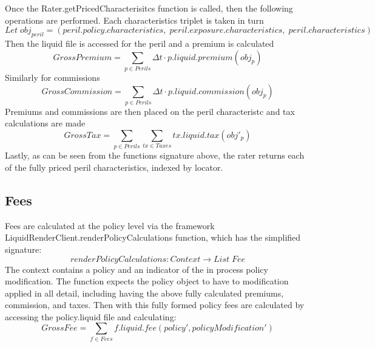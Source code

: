 Once the Rater.getPricedCharacterisitcs function is called, then the following operations are performed. Each
characteristics triplet is taken in turn
\begin{equation*}
Let \; obj_{peril} = (peril.policy.characteristics, \; peril.exposure.characteristics, \; peril.characteristics)
\end{equation*}
Then the liquid file is accessed for the peril and a premium is calculated
\begin{equation*}
GrossPremium = \sum_{p \in Perils} \Delta t \cdot p.liquid.premium(obj_p) 
\end{equation*}
Similarly for commissions
\begin{equation*}
GrossCommission = \sum_{p \in Perils} \Delta t \cdot p.liquid.commission(obj_p)
\end{equation*}
Premiums and commissions are then placed on the peril characteristc and tax calculations are made
\begin{equation*}
  GrossTax = \sum_{p \in Perils} \sum_{tx \in Taxes} tx.liquid.tax(obj'_p) 
\end{equation*}
Lastly, as can be seen from the functions signature above, the rater returns each of the fully priced peril characteristics, indexed
by locator.

\subsection{Fees}
Fees are calculated at the policy level via the framework LiquidRenderClient.renderPolicyCalculations function, which has the
simplified signature:
\begin{equation*}
  renderPolicyCalculations: Context \to List \; Fee
\end{equation*}
The context contains a policy and an indicator of the in process policy modification. The function expects the policy object to
have to modification applied in all detail, including having the above fully calculated premiums, commission, and taxes.
Then with this fully formed policy fees are calculated by accessing the policy.liquid file and calculating:
\begin{equation*}
GrossFee = \sum_{f \in Fees} f.liquid.fee(policy', policyModification')
\end{equation*}

